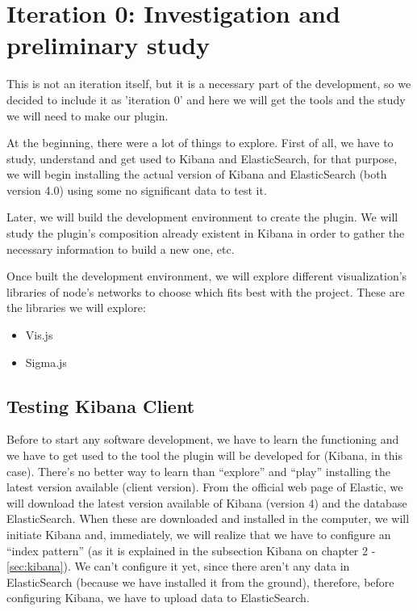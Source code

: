 \documentclass[a4paper, 12pt]{book}
\begin{document}
\section{Iteration 0: Investigation and preliminary study} 
\label{sec:it0}
This is not an iteration itself, but it is a necessary part of the development, so we decided to include it as 'iteration 0' and here we will get the tools and the study we will need to make our plugin. 

At the beginning, there were a lot of things to explore. First of all, we have to study, understand and get used to Kibana and ElasticSearch, for that purpose, we will begin installing the actual version of Kibana and ElasticSearch (both version 4.0) using some no significant data to test it.

Later, we will build the development environment to create the plugin. We will study the plugin’s composition already existent in Kibana in order to gather the necessary information to build a new one, etc.

Once built the development environment, we will explore different visualization’s libraries of node’s networks to choose which fits best with the project. These are the libraries we will explore:

\begin{itemize}
\item Vis.js
\item Sigma.js
\end{itemize}

\subsection{Testing Kibana Client}

Before to start any software development, we have to learn the functioning and we have to get used to the tool the plugin will be developed for (Kibana, in this case). There’s no better way to learn than “explore” and “play” installing the latest version available (client version). From the official web page of Elastic, we will download the latest version available of Kibana (version 4) and the database ElasticSearch.  When these are downloaded and installed in the computer, we will initiate Kibana and, immediately, we will realize that we have to configure an “index pattern” (as it is explained in the subsection Kibana on chapter 2 - \ref{sec:kibana}). We can’t configure it yet, since there aren’t any data in ElasticSearch (because we have installed it from the ground), therefore, before configuring Kibana, we have to upload data to ElasticSearch.
\end{document}
